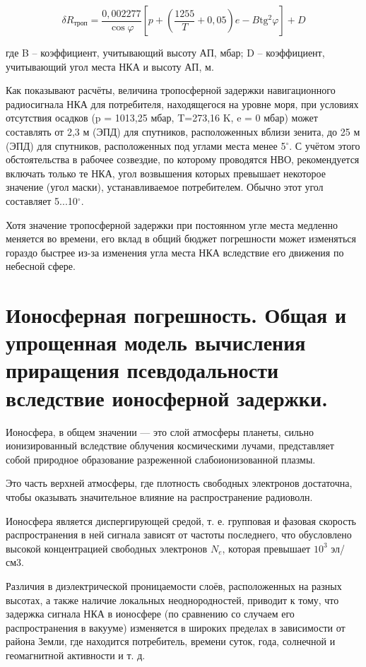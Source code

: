 \documentclass[14pt,a4paper,oneside]{extarticle}
\begin{document}
\[\delta R_{\text{троп}}=\frac{0,002277}{\cos\varphi}\left[p+\left(\frac{1255}{T}+0,05\right)e-B\mathrm{tg}^{2}\varphi\right]+D\]

где B – коэффициент, учитывающий высоту АП, мбар; D – коэффициент, учитывающий угол места НКА и высоту АП, м.

Как показывают расчёты, величина тропосферной задержки навигационного радиосигнала НКА для потребителя, находящегося на уровне моря, при условиях отсутствия осадков (p = 1013,25 мбар, T=273,16 K, e = 0 мбар) может составлять от 2,3 м (ЭПД) для спутников, расположенных вблизи зенита, до 25 м (ЭПД) для спутников, расположенных под углами места менее 5$^\circ$. С учётом этого обстоятельства в рабочее созвездие, по которому проводятся НВО, рекомендуется включать только те НКА, угол возвышения которых превышает некоторое значение (угол маски), устанавливаемое потребителем. Обычно этот угол составляет 5...10$^\circ$.

Хотя значение тропосферной задержки при постоянном угле места медленно меняется во времени, его вклад в общий бюджет погрешности может изменяться гораздо быстрее из-за изменения угла места НКА вследствие его движения по небесной сфере.

\section{Ионосферная погрешность. Общая и упрощенная модель вычисления приращения псевдодальности вследствие ионосферной задержки.}

Ионосфера, в общем значении — это слой атмосферы планеты, сильно ионизированный вследствие облучения космическими лучами,
представляет собой природное образование разреженной слабоионизованной плазмы.

Это часть верхней атмосферы, где плотность свободных электронов достаточна, чтобы оказывать значительное влияние на распространение радиоволн.

Ионосфера является диспергирующей средой, т. е. групповая и фазовая скорость распространения в ней сигнала зависят от частоты последнего, что обусловлено высокой концентрацией свободных электронов $N_e$, которая превышает $10^3$ эл/см3.

Различия в диэлектрической проницаемости слоёв, расположенных на разных высотах, а также наличие локальных неоднородностей, приводит к тому, что задержка сигнала НКА в ионосфере (по сравнению со случаем его распространения в вакууме) изменяется в широких пределах в зависимости от района Земли, где находится потребитель, времени суток, года, солнечной и геомагнитной активности и т. д.
\end{document}
